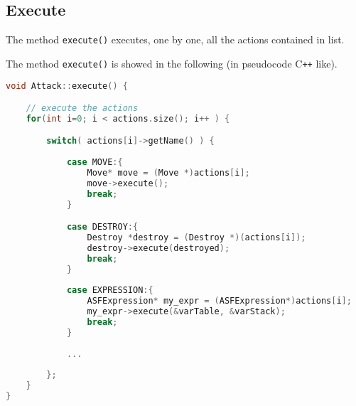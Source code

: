 \subsection{Execute}
The method \texttt{execute()} executes, one by one, all the actions contained in list. 
%
\iffalse
Each action is handled in a particular way. In conditional and unconditional attacks, in addiction to the variable table we find the \texttt{packetTable}, the idea is like the varTable in fact it contains the packets created by a \texttt{Clone} or a \texttt{Create}. The new packets are sended by the LocalFilter or GlobalFilter after the end of the attack's execution.
\fi
The method \texttt{execute()} is showed in the following (in pseudocode C\texttt{++} like).
%
\begin{lstlisting}[language={cpp}]
void Attack::execute() {

	// execute the actions
	for(int i=0; i < actions.size(); i++ ) {

		switch( actions[i]->getName() ) {
		  
			case MOVE:{
				Move* move = (Move *)actions[i];
				move->execute();
				break;
			}

			case DESTROY:{
				Destroy *destroy = (Destroy *)(actions[i]);
				destroy->execute(destroyed);
				break;
			}
	
			case EXPRESSION:{
				ASFExpression* my_expr = (ASFExpression*)actions[i];
				my_expr->execute(&varTable, &varStack);
				break;
			}
            
			...
            
		};
	}
}
\end{lstlisting}
\iffalse
the name of the action  used in a \texttt{switch} to understand the action type and then we cast it in the real action. Complex action like change or create have much more helpfull code to support it.
\fi



